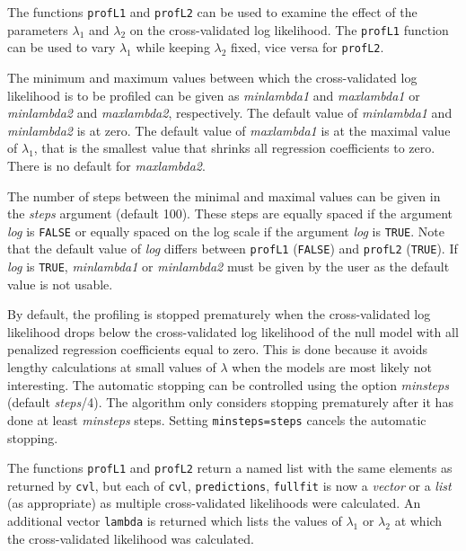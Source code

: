 \documentclass[a4paper]{article}
\newcommand{\Robject}[1]{{\texttt{#1}}}
\newcommand{\Rfunction}[1]{{\texttt{#1}}}
\newcommand{\Rclass}[1]{{\textit{#1}}}
\newcommand{\Rfunarg}[1]{{\textit{#1}}}
\begin{document}
The functions \Rfunction{profL1} and \Rfunction{profL2} can be used to examine the effect of the parameters $\lambda_1$ and $\lambda_2$ on the cross-validated log likelihood. The \Rfunction{profL1} function can be used to vary $\lambda_1$ while keeping $\lambda_2$ fixed, vice versa for \Rfunction{profL2}.

The minimum and maximum values between which the cross-validated log likelihood is to be profiled can be given as \Rfunarg{minlambda1} and  \Rfunarg{maxlambda1} or \Rfunarg{minlambda2} and  \Rfunarg{maxlambda2}, respectively. The default value of \Rfunarg{minlambda1} and  \Rfunarg{minlambda2} is at zero.  The default value of \Rfunarg{maxlambda1} is at the maximal value of $\lambda_1$, that is the smallest value that shrinks all regression coefficients to zero. There is no default for \Rfunarg{maxlambda2}.

The number of steps between the minimal and maximal values can be given in the \Rfunarg{steps} argument (default 100). These steps are equally spaced if the argument \Rfunarg{log} is \Robject{FALSE} or equally spaced on the log scale if the argument \Rfunarg{log} is \Robject{TRUE}. Note that the default value of \Rfunarg{log} differs between \Rfunction{profL1} (\Robject{FALSE}) and \Rfunction{profL2} (\Robject{TRUE}). If \Rfunarg{log} is \Robject{TRUE}, \Rfunarg{minlambda1} or \Rfunarg{minlambda2} must be given by the user as the default value is not usable.

By default, the profiling is stopped prematurely when the cross-validated log likelihood drops below the cross-validated log likelihood of the null model with all penalized regression coefficients equal to zero. This is done because it avoids lengthy calculations at small values of $\lambda$ when the models are most likely not interesting. The automatic stopping can be controlled using the option \Rfunarg{minsteps} (default \Rfunarg{steps}/4). The algorithm only considers stopping prematurely after it has done at least \Rfunarg{minsteps} steps. Setting \Robject{minsteps=steps} cancels the automatic stopping.

The functions \Rfunction{profL1} and \Rfunction{profL2} return a named list with the same elements as returned by \Rfunction{cvl}, but each of \Robject{cvl}, \Robject{predictions}, \Robject{fullfit} is now a \Rclass{vector} or a \Rclass{list} (as appropriate) as multiple cross-validated likelihoods were calculated. An additional vector \Robject{lambda} is returned which lists the values of $\lambda_1$ or $\lambda_2$ at which the cross-validated likelihood was calculated.
\end{document}
